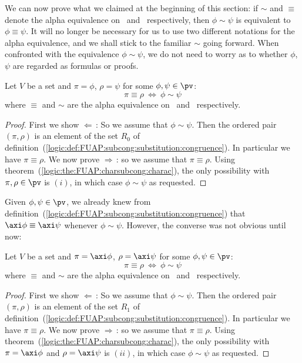 We can now prove what we claimed at the beginning of this section:
if $\sim$ and $\equiv$ denote the alpha equivalence on \pv\
and \pvs\ respectively, then $\phi\sim\psi$ is equivalent to
$\phi\equiv\psi$. It will no longer be necessary for us to use two
different notations for the alpha equivalence, and we shall
stick to the familiar $\sim$ going forward. When confronted with the
equivalence $\phi\sim\psi$, we do not need to worry as to whether
$\phi$, $\psi$ are regarded as formulas or proofs.

\begin{prop}\label{logic:prop:FUAP:charsubsong:equivalence:formula}
Let $V$ be a set and $\pi=\phi$, $\rho=\psi$ for some
$\phi,\psi\in\pv$:
    \[
    \pi\equiv\rho\ \Leftrightarrow\ \phi\sim\psi
    \]
where $\equiv$ and $\sim$ are the alpha equivalence on \pvs\
and \pv\ respectively.
\end{prop}
\begin{proof}
First we show $\Leftarrow$\,: So we assume that $\phi\sim\psi$. Then
the ordered pair $(\pi,\rho)$ is an element of the set $R_{0}$ of
definition~(\ref{logic:def:FUAP:subcong:substitution:congruence}).
In particular we have $\pi\equiv\rho$. We now prove $\Rightarrow$\,:
so we assume that $\pi\equiv\rho$. Using
theorem~(\ref{logic:the:FUAP:charsubcong:charac}), the only
possibility with $\pi,\rho\in\pv$ is $(i)$, in which case
$\phi\sim\psi$ as requested.
\end{proof}

Given $\phi,\psi\in\pv$, we already knew from
definition~(\ref{logic:def:FUAP:subcong:substitution:congruence})
that $\axi\phi\equiv\axi\psi$ whenever $\phi\sim\psi$. However, the
converse was not obvious until now:

\begin{prop}\label{logic:prop:FUAP:charsubsong:equivalence:axiom}
Let $V$ be a set and $\pi=\axi\phi$, $\rho=\axi\psi$ for some
$\phi,\psi\in\pv$:
    \[
    \pi\equiv\rho\ \Leftrightarrow\ \phi\sim\psi
    \]
where $\equiv$ and $\sim$ are the alpha equivalence on \pvs\
and \pv\ respectively.
\end{prop}
\begin{proof}
First we show $\Leftarrow$\,: So we assume that $\phi\sim\psi$. Then
the ordered pair $(\pi,\rho)$ is an element of the set $R_{1}$ of
definition~(\ref{logic:def:FUAP:subcong:substitution:congruence}).
In particular we have $\pi\equiv\rho$. We now prove $\Rightarrow$\,:
so we assume that $\pi\equiv\rho$. Using
theorem~(\ref{logic:the:FUAP:charsubcong:charac}), the only
possibility with $\pi=\axi\phi$ and $\rho=\axi\psi$ is $(ii)$, in
which case $\phi\sim\psi$ as requested.
\end{proof}
